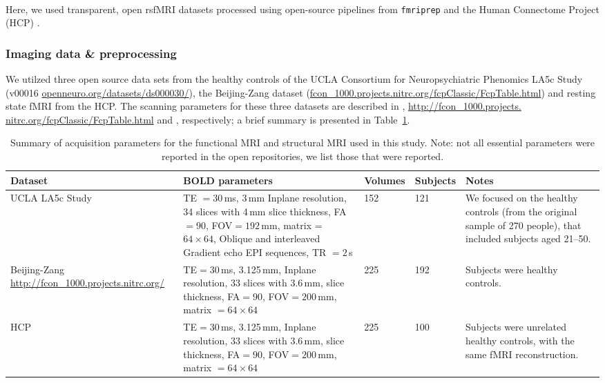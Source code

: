 \documentclass[oneside]{zHenriquesLab-StyleBioRxiv}
\begin{document}
\paragraph{}
Here, we used transparent, open rsfMRI datasets processed using open-source pipelines from \verb|fmriprep| \cite{esteban2019fmriprep} and the Human Connectome Project (HCP) \cite{van2013wu}. 
\subsubsection*{Imaging data \& preprocessing}
We utilzed three open source data sets from the healthy controls of the UCLA Consortium for Neuropsychiatric Phenomics LA5c Study \cite{poldrack2016phenome} (v00016 \url{openneuro.org/datasets/ds000030/}), the Beijing-Zang dataset (\url{fcon_1000.projects.nitrc.org/fcpClassic/FcpTable.html}) and resting state fMRI from the HCP. The scanning parameters for these three datasets are described in \cite{esteban2019fmriprep}, \url{http://fcon_1000.projects. nitrc.org/fcpClassic/FcpTable.html} and \cite{van2013wu}, respectively; a brief summary is presented in Table~\ref{tab:scanning_params}.

\begin{table}[ht!]
\begin{center}
    \begin{tabular}{  p{2.5cm}  p{5cm}  l  p{1.5cm}  p{4cm} }
    \textbf{\sffamily Dataset} & \textbf{\sffamily BOLD parameters} & \textbf{\sffamily Volumes} & \textbf{\sffamily Subjects} & \textbf{\sffamily Notes} \\
    \hline
    UCLA LA5c Study \cite{poldrack2016phenome} & TE $=30$\,ms, 3\,mm Inplane resolution, 34 slices with 4\,mm slice thickness, FA$=90$, FOV$=192$\,mm, matrix = $64 \times 64$,
    Oblique and interleaved Gradient echo EPI sequences, TR $= 2$\,s & 152 & 121 & We focused on the healthy controls (from the original sample of 270 people), that included subjects aged 21--50.\\
    \hline
    Beijing-Zang \url{http://fcon_1000.projects.nitrc.org/} & TE$=30$\,ms, 3.125\,mm, Inplane resolution, 33 slices with 3.6\,mm, slice thickness, FA$=90$, FOV$=200$\,mm, matrix $=64 \times 64$ & 225 & 192 & Subjects were healthy controls. \\
    \hline
	HCP & TE$=30$\,ms, 3.125\,mm, Inplane resolution, 33 slices with 3.6\,mm, slice thickness, FA$=90$, FOV$=200$\,mm, matrix $=64 \times 64$ & 225 & 100 & Subjects were unrelated healthy controls, with the same fMRI reconstruction. \\
    \hline
    \end{tabular}
    \caption{Summary of acquisition parameters for the functional MRI and structural MRI used in this study.
	Note: not all essential parameters were reported in the open repositories, we list those that were reported.
    \label{tab:scanning_params}}
\end{center}
\end{table}
\end{document}
